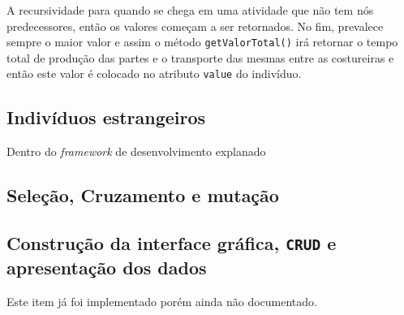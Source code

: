 A recursividade para quando se chega em uma atividade que não tem nós predecessores, então os valores começam a ser retornados. 
No fim, prevalece sempre o maior valor e assim o método \texttt{getValorTotal()} irá retornar o tempo total de 
produção das partes e o transporte das mesmas entre as costureiras e então este valor é colocado no atributo \texttt{value} do 
indivíduo.


\subsection{Indivíduos estrangeiros}
 \par Dentro do \textit{framework} de desenvolvimento explanado 
  
\subsection{Seleção, Cruzamento e mutação}
\par 
 
\subsection{Construção da interface gráfica, \texttt{CRUD} e apresentação dos
dados} 
\par Este item já foi implementado porém ainda não documentado. 



